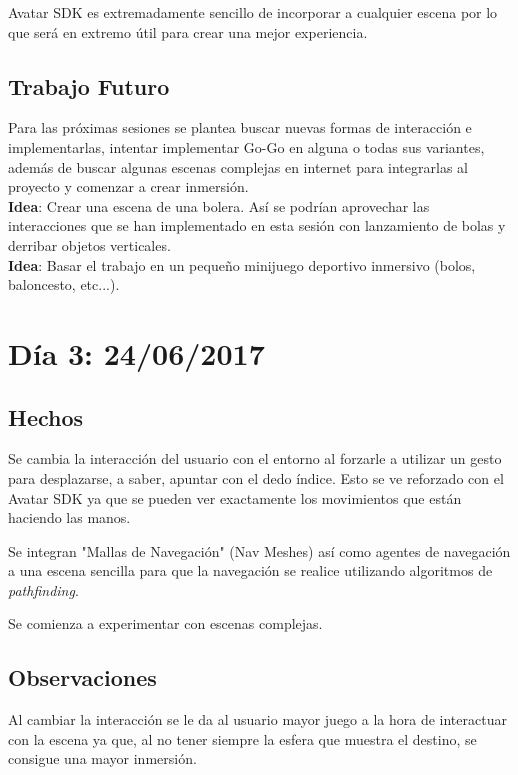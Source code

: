 \documentclass[12pt,a4paper]{article}
\begin{document}
Avatar SDK es extremadamente sencillo de incorporar a cualquier escena por lo que será en extremo útil para crear una mejor experiencia.

\subsection{Trabajo Futuro}

Para las próximas sesiones se plantea buscar nuevas formas de interacción e implementarlas, intentar implementar Go-Go en alguna o todas sus variantes, además de buscar algunas escenas complejas en internet para integrarlas al proyecto y comenzar a crear inmersión.\\
\textbf{Idea}: Crear una escena de una bolera. Así se podrían aprovechar las interacciones que se han implementado en esta sesión con lanzamiento de bolas y derribar objetos verticales.\\
\textbf{Idea}: Basar el trabajo en un pequeño minijuego deportivo inmersivo (bolos, baloncesto, etc...).

\section{Día 3: 24/06/2017}

\subsection{Hechos}

Se cambia la interacción del usuario con el entorno al forzarle a utilizar un gesto para desplazarse, a saber, apuntar con el dedo índice.
Esto se ve reforzado con el Avatar SDK ya que se pueden ver exactamente los movimientos que están haciendo las manos.

Se integran "Mallas de Navegación" (Nav Meshes) así como agentes de navegación a una escena sencilla para que la navegación se realice utilizando algoritmos de \textit{pathfinding}.

Se comienza a experimentar con escenas complejas.

\subsection{Observaciones}

Al cambiar la interacción se le da al usuario mayor juego a la hora de interactuar con la escena ya que, al no tener siempre la esfera que muestra el destino, se consigue una mayor inmersión.
\end{document}
